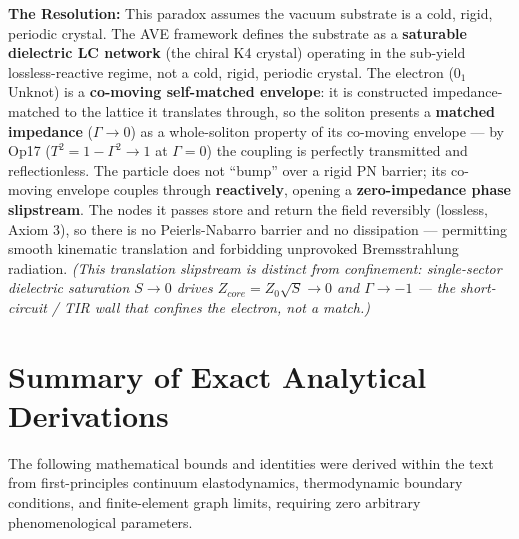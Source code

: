 \textbf{The Resolution:} This paradox assumes the vacuum substrate is a cold, rigid, periodic crystal. The AVE framework defines the substrate as a \textbf{saturable dielectric LC network} (the chiral K4 crystal) operating in the sub-yield lossless-reactive regime, not a cold, rigid, periodic crystal. The electron ($0_1$ Unknot) is a \textbf{co-moving self-matched envelope}: it is constructed impedance-matched to the lattice it translates through, so the soliton presents a \textbf{matched impedance} ($\Gamma \to 0$) as a whole-soliton property of its co-moving envelope --- by Op17 ($T^2 = 1 - \Gamma^2 \to 1$ at $\Gamma = 0$) the coupling is perfectly transmitted and reflectionless. The particle does not ``bump'' over a rigid PN barrier; its co-moving envelope couples through \textbf{reactively}, opening a \textbf{zero-impedance phase slipstream}. The nodes it passes store and return the field reversibly (lossless, Axiom 3), so there is no Peierls-Nabarro barrier and no dissipation --- permitting smooth kinematic translation and forbidding unprovoked Bremsstrahlung radiation. \emph{(This translation slipstream is distinct from confinement: single-sector dielectric saturation $S \to 0$ drives $Z_{core} = Z_0\sqrt{S} \to 0$ and $\Gamma \to -1$\gammaundeclared{} --- the short-circuit / TIR wall that \emph{confines} the electron, not a match.)}

\chapter{Summary of Exact Analytical Derivations}

The following mathematical bounds and identities were derived within the text from first-principles continuum elastodynamics, thermodynamic boundary conditions, and finite-element graph limits, requiring zero arbitrary phenomenological parameters.

